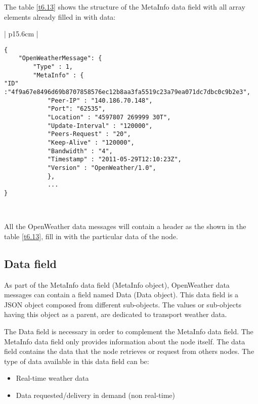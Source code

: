 The table \ref{t6.13} shows the structure of the MetaInfo data field with all array elements already filled in with data:

\begin{table}[H]
\centering
\begin{tabular}{| p{15.6cm} |}
\hline
\begin{minipage}[t]{\linewidth}
	\begin{verbatim}
{
    "OpenWeatherMessage": {
        "Type" : 1,
        "MetaInfo" : {
"ID" :"4f9a67e8496d69b8707858576ec12b8aa3fa5519c23a79ea071dc7dbc0c9b2e3",
            "Peer-IP" : "140.186.70.148",
            "Port": "62535",
            "Location" : "4597807 269999 30T",
            "Update-Interval" : "120000",
            "Peers-Request" : "20",
            "Keep-Alive" : "120000",
            "Bandwidth" : "4",
            "Timestamp" : "2011-05-29T12:10:23Z",
            "Version" : "OpenWeather/1.0",
            },
            ...
}
\end{verbatim}
\end{minipage} \\
\hline
\end{tabular}
\caption{MetaInfo data field (MetaInfo object) in a data message of OpenWeather.}
\label{t6.13}
\end{table}

All the OpenWeather data messages will contain a header as the shown in the table \ref{t6.13}, fill in with the particular data of the node.

\subsection{Data field}

As part of the MetaInfo data field (MetaInfo object), OpenWeather data messages can contain a field named Data (Data object). 
This data field is a \gls{JSON} object composed from different sub-objects. The values or sub-objects having this object as a parent, are dedicated to transport weather data.

The Data field is necessary in order to complement the MetaInfo data field. The MetaInfo data field only provides information about the node itself. The data field contains the data that the node retrieves or request from others nodes. The type of data available in this data field can be:

\begin{itemize}
\item Real-time weather data
\item Data requested/delivery in demand (non real-time)
\end{itemize}

